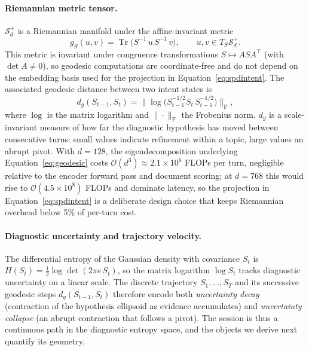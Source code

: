 \documentclass[11pt]{article}
\DeclareMathOperator{\Tr}{Tr}
\begin{document}
\paragraph{Riemannian metric tensor.} $\mathcal{S}_d^+$ is a Riemannian manifold under the affine-invariant metric
\begin{equation}
g_S(u,v) = \Tr\bigl(S^{-1}\, u\, S^{-1}\, v\bigr), \qquad u,v \in T_S\mathcal{S}_d^+.
\label{eq:metric}
\end{equation}
This metric is invariant under congruence transformations $S \mapsto A S A^{\top}$ (with $\det A \neq 0$), so geodesic computations are coordinate-free and do not depend on the embedding basis used for the projection in Equation~\ref{eq:spdintent}. The associated geodesic distance between two intent states is
\begin{equation}
d_g(S_{t-1},S_t) = \bigl\| \log\bigl(S_{t-1}^{-1/2} S_t\, S_{t-1}^{-1/2}\bigr) \bigr\|_{\mathrm{F}},
\label{eq:geodesic}
\end{equation}
where $\log$ is the matrix logarithm and $\|\cdot\|_{\mathrm{F}}$ the Frobenius norm. $d_g$ is a scale-invariant measure of how far the diagnostic hypothesis has moved between consecutive turns: small values indicate refinement within a topic, large values an abrupt pivot. With $d=128$, the eigendecomposition underlying Equation~\ref{eq:geodesic} costs $\mathcal{O}(d^3)\approx 2.1\times10^6$ FLOPs per turn, negligible relative to the encoder forward pass and document scoring; at $d=768$ this would rise to $\mathcal{O}(4.5\times10^8)$ FLOPs and dominate latency, so the projection in Equation~\ref{eq:spdintent} is a deliberate design choice that keeps Riemannian overhead below 5\% of per-turn cost.

\paragraph{Diagnostic uncertainty and trajectory velocity.} The differential entropy of the Gaussian density with covariance $S_t$ is $H(S_t)=\tfrac{1}{2}\log\det(2\pi e\,S_t)$, so the matrix logarithm $\log S_t$ tracks diagnostic uncertainty on a linear scale. The discrete trajectory $S_1,\dots,S_T$ and its successive geodesic steps $d_g(S_{t-1},S_t)$ therefore encode both \emph{uncertainty decay} (contraction of the hypothesis ellipsoid as evidence accumulates) and \emph{uncertainty collapse} (an abrupt contraction that follows a pivot). The session is thus a continuous path in the diagnostic entropy space, and the objects we derive next quantify its geometry.
\end{document}
